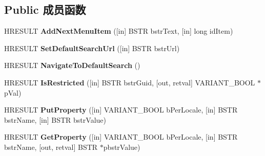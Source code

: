 \subsection*{Public 成员函数}
\begin{DoxyCompactItemize}
\item 
\mbox{\label{interface_s_h_doc_vw_1_1_i_search_assistant_o_c_ae3f0a024fc6f555412787374b9829672}} 
H\+R\+E\+S\+U\+LT {\bfseries Add\+Next\+Menu\+Item} (\mbox{[}in\mbox{]} B\+S\+TR bstr\+Text, \mbox{[}in\mbox{]} long id\+Item)
\item 
\mbox{\label{interface_s_h_doc_vw_1_1_i_search_assistant_o_c_a3176b51ae6ed53bde7acd524e740bb85}} 
H\+R\+E\+S\+U\+LT {\bfseries Set\+Default\+Search\+Url} (\mbox{[}in\mbox{]} B\+S\+TR bstr\+Url)
\item 
\mbox{\label{interface_s_h_doc_vw_1_1_i_search_assistant_o_c_a6c2b31433343e7ea1739f9d9d34b3b92}} 
H\+R\+E\+S\+U\+LT {\bfseries Navigate\+To\+Default\+Search} ()
\item 
\mbox{\label{interface_s_h_doc_vw_1_1_i_search_assistant_o_c_a4b8e2281cfeeeca5f3aaf2de62ff15da}} 
H\+R\+E\+S\+U\+LT {\bfseries Is\+Restricted} (\mbox{[}in\mbox{]} B\+S\+TR bstr\+Guid, \mbox{[}out, retval\mbox{]} V\+A\+R\+I\+A\+N\+T\+\_\+\+B\+O\+OL $\ast$p\+Val)
\item 
\mbox{\label{interface_s_h_doc_vw_1_1_i_search_assistant_o_c_a0e11db3f08b3e0500d05c87c6df8b715}} 
H\+R\+E\+S\+U\+LT {\bfseries Put\+Property} (\mbox{[}in\mbox{]} V\+A\+R\+I\+A\+N\+T\+\_\+\+B\+O\+OL b\+Per\+Locale, \mbox{[}in\mbox{]} B\+S\+TR bstr\+Name, \mbox{[}in\mbox{]} B\+S\+TR bstr\+Value)
\item 
\mbox{\label{interface_s_h_doc_vw_1_1_i_search_assistant_o_c_a14b6ed9aece8b18622bb8ce094609abb}} 
H\+R\+E\+S\+U\+LT {\bfseries Get\+Property} (\mbox{[}in\mbox{]} V\+A\+R\+I\+A\+N\+T\+\_\+\+B\+O\+OL b\+Per\+Locale, \mbox{[}in\mbox{]} B\+S\+TR bstr\+Name, \mbox{[}out, retval\mbox{]} B\+S\+TR $\ast$pbstr\+Value)
\item 

\end{DoxyCompactItemize}
